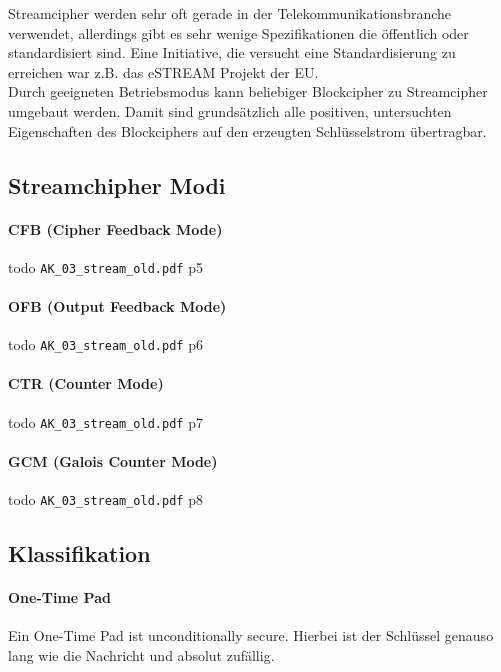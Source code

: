 \noindent Streamcipher werden sehr oft gerade in der Telekommunikationsbranche verwendet,
allerdings gibt es sehr wenige Spezifikationen die öffentlich oder standardisiert sind. Eine Initiative, die versucht eine Standardisierung zu erreichen war z.B. das
eSTREAM Projekt der EU. \\

\noindent Durch geeigneten Betriebsmodus kann beliebiger Blockcipher zu Streamcipher umgebaut werden. Damit sind grundsätzlich alle positiven, untersuchten Eigenschaften des
Blockciphers auf den erzeugten Schlüsselstrom übertragbar.

\subsection{Streamchipher Modi}

\paragraph{CFB (Cipher Feedback Mode)}

todo \verb|AK_03_stream_old.pdf| p5

\paragraph{OFB (Output Feedback Mode)}

todo \verb|AK_03_stream_old.pdf| p6

\paragraph{CTR (Counter Mode)}

todo \verb|AK_03_stream_old.pdf| p7

\paragraph{GCM (Galois Counter Mode)}

todo \verb|AK_03_stream_old.pdf| p8

\subsection{Klassifikation}

\paragraph{One-Time Pad}

Ein One-Time Pad ist unconditionally secure. Hierbei ist der Schlüssel genauso lang wie die Nachricht und absolut zufällig.

